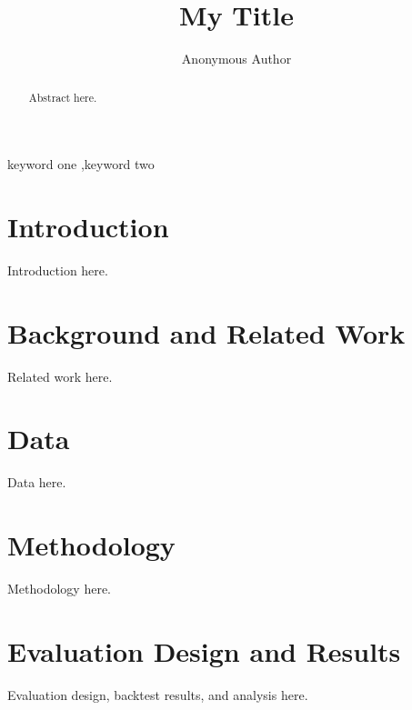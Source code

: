 \documentclass[preprint,12pt,authoryear]{elsarticle}
\begin{document}
\begin{frontmatter}

\title{My Title}

\author[inst1]{Anonymous Author}

\begin{abstract}
Abstract here.
\end{abstract}

\begin{keyword}
keyword one \sep keyword two
\end{keyword}

\end{frontmatter}

\section{Introduction}
\label{sec:intro}
Introduction here.

\section{Background and Related Work}
\label{sec:related_work}
Related work here.

\section{Data}
\label{sec:data}
Data here.

\section{Methodology}
\label{sec:method}
Methodology here.

\section{Evaluation Design and Results}
\label{sec:experiments}
Evaluation design, backtest results, and analysis here.
\end{document}

